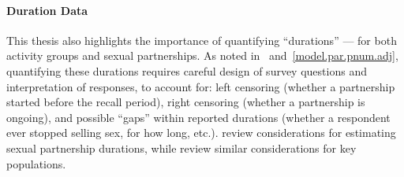 \paragraph{Duration Data}
This thesis also highlights the importance of quantifying ``durations''
--- for both activity groups and sexual partnerships.
As noted in ~and~\ref{model.par.pnum.adj},
quantifying these durations requires
careful design of survey questions and interpretation of responses, to account for:
left censoring (\eg whether a partnership started before the recall period),
right censoring (\eg whether a partnership is ongoing), and
possible ``gaps'' within reported durations
(\eg whether a respondent ever stopped selling sex, for how long, etc.).
\citet{Burington2010} review considerations for estimating sexual partnership durations, while
\citet{Fazito2012} review similar considerations for key populations.
\clearpage %
